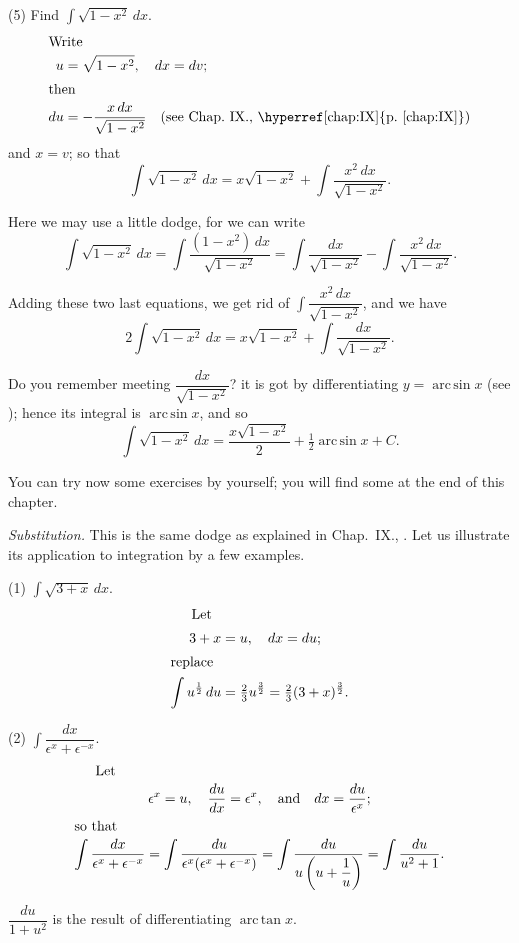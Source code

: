 \documentclass[12pt]{book}[2005/09/16]
\newcommand{\ds}{\displaystyle}
\newcommand{\Paragraph}[1]{\medskip\pagebreak[1]\par\textit{#1}}
\newcommand{\DPPageSep}[2]{\Pagelabel{#2}}
\newcommand{\Pagelabel}[1]
  {\phantomsection\label{#1}}
\newcommand{\Pageref}[2][p.]{%
  \ifthenelse{\not\equal{#1}{}}{%
    \hyperref[#2]{#1~\pageref*{#2}}%
  }{%
    \hyperref[#2]{\pageref{*#2}}%
  }%
}
\newcommand{\efrac}[2]{\frac{#1}{#2}}
\DeclareMathOperator{\Arcsin}{arc\,sin}
\renewcommand{\arcsin}{\Arcsin}
\DeclareMathOperator{\Arctan}{arc\,tan}
\renewcommand{\arctan}{\Arctan}
\begin{document}
(5) Find $\ds\int \sqrt{1-x^2}\, dx$.
\begin{align*}
\intertext{Write}
u &= \sqrt{1-x^2},\quad dx=dv;  \\
\intertext{then}
du &= -\frac{x\, dx}{\sqrt{1-x^2}}\quad \text{(see Chap.~IX., \Pageref{chap:IX})}
\end{align*}
and $x=v$; so that
\[
\int \sqrt{1-x^2}\, dx=x \sqrt{1-x^2} + \int \frac{x^2\, dx}{\sqrt{1-x^2}}.
\]

Here we may use a little dodge, for we can write
\[
\int \sqrt{1-x^2}\, dx
  = \int \frac{(1-x^2)\, dx}{\sqrt{1-x^2}}
  = \int \frac{dx}{\sqrt{1-x^2}} - \int \frac{x^2\, dx}{\sqrt{1-x^2}}.
\]

Adding these two last equations, we get rid of
$\ds\int \dfrac{x^2\, dx}{\sqrt{1-x^2}}$, and we have
\[
2 \int \sqrt{1-x^2}\, dx = x\sqrt{1-x^2} + \int \frac{dx}{\sqrt{1-x^2}}.
\]
\DPPageSep{241.png}{229}%

Do you remember meeting $\dfrac {dx}{\sqrt{1-x^2}}$? it is got by
differentiating $y=\arcsin x$ (see \Pageref{intex3}); hence its integral
is $\arcsin x$, and so
\[
\int \sqrt{1-x^2}\, dx = \frac{x \sqrt{1-x^2}}{2} + \tfrac{1}{2} \arcsin x +C.
\]

You can try now some exercises by yourself; you
will find some at the end of this chapter.

\Paragraph{Substitution.} This is the same dodge as explained
in Chap.~IX., \Pageref{chap:IX}. Let us illustrate its application
to integration by a few examples.

(1) $\ds\int \sqrt{3+x}\, dx$.
\begin{align*}
\intertext{\indent Let}
3+x &= u,\quad dx = du; \\
\intertext{replace}
\int u^{\efrac{1}{2}}\, du
  &= \tfrac{2}{3} u^{\efrac{3}{2}} = \tfrac{2}{3}(3+x)^{\efrac{3}{2}}.
\end{align*}

(2) $\ds\int \dfrac{dx}{\epsilon^x+\epsilon^{-x}}$.
\begin{gather*}
\intertext{\indent Let}
\epsilon^x = u,\quad \frac{du}{dx} = \epsilon^x,\quad\text{and}\quad
dx = \frac{du}{\epsilon^x}; \\
\intertext{so that}
\int \frac{dx}{\epsilon^x+\epsilon^{-x}}
  = \int \frac{du}{\epsilon^x(\epsilon^x+\epsilon^{-x})}
  = \int \frac{du}{u\left(u + \dfrac{1}{u}\right)}
  = \int \frac{du}{u^2+1}.
\end{gather*}

$\dfrac{du}{1+u^2}$ is the result of differentiating $\arctan x$.
\end{document}
